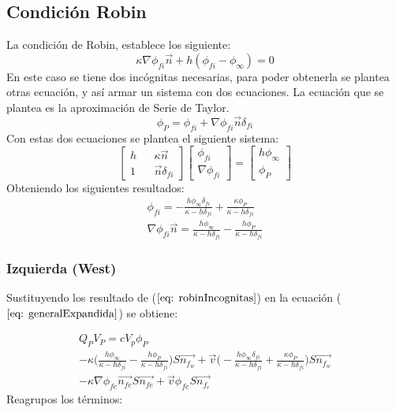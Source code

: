 \documentclass{article}
\begin{document}
    \subsection{Condición Robin}
    La condición de Robin, establece los siguiente:
    \begin{equation*}
        \kappa \nabla \phi_{fi} \vec{n} + h (\phi_{fi} - \phi_{\infty}) = 0
    \end{equation*}{}
    En este caso se tiene dos incógnitas necesarias, para poder obtenerla se plantea otras ecuación, y así armar un sistema con dos ecuaciones. La ecuación que se plantea es la aproximación de Serie de Taylor.
    \begin{equation*}
        \phi_P = \phi_{fi} + \nabla \phi_{fi} \vec{n} \delta_{fi}
    \end{equation*}{}
    Con estas dos ecuaciones se plantea el siguiente sistema:
   \[ 
   \begin{bmatrix}
        h && \kappa \vec{n} \\
        1 && \vec{n} \delta_{fi}
   \end{bmatrix}
   \begin{bmatrix}
        \phi_{fi} \\
        \nabla \phi_{fi}
   \end{bmatrix}
   =
   \begin{bmatrix}
   h \phi_{\infty} \\
   \phi_P
   \end{bmatrix}
   \]
  Obteniendo los siguientes resultados:
  \begin{equation}
      \begin{aligned}
         \phi_{fi} = -\frac{h \phi_{\infty} \delta_{fi}}{\kappa - h \delta_{fi}} + \frac{\kappa \phi_P} {\kappa - h \delta_{fi}} \\
         \nabla \phi_{fi} \vec{n} = \frac{h \phi_{\infty}} {\kappa - h \delta_{fi}} - \frac{h \phi_P}  {\kappa - h \delta_{fi}}
      \end{aligned}
      \label{eq: robinIncognitas}
  \end{equation}
  \subsubsection{Izquierda (West)}
  Sustituyendo los resultado de ($\ref{eq: robinIncognitas}$)  en la ecuación ($\ref{eq: generalExpandida}$) se obtiene:
  
  \begin{multline*}
        Q_P V_P = c V_p\phi_P   \\
        - \kappa  \big( \frac{h \phi_{\infty}} {\kappa - h \delta_{fi}} - \frac{h \phi_P}  {\kappa - h \delta_{fi}} \big) S \vec{n_{f_w}} + \vec{v}   \big (-\frac{h \phi_{\infty} \delta_{fi}}{\kappa - h \delta_{fi}} + \frac{\kappa \phi_P} {\kappa - h \delta_{fi}} \big) S \vec{n_{f_w}} \\
        - \kappa \nabla \phi_{fe} \vec{n_{fe}} S \vec{n_{fe}} + \vec{v}\phi_{fe} S \vec{n_{f_e}}
    \end{multline*} 
    Reagrupos los términos:
    
\end{document}
